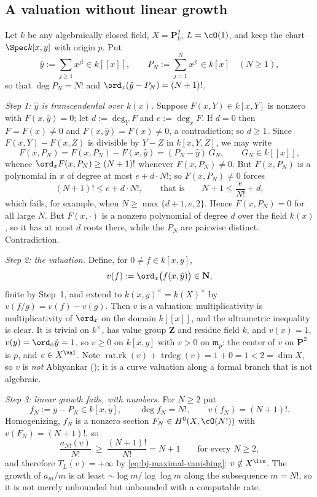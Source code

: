 \subsection{A valuation without linear growth}
\label{sec:ch49-no-growth}

\begin{example}
\label{ex:ch49-no-linear-growth}
Let $k$ be any algebraically closed field, $X=\mathbf P^2_k$,
$L=\cO(1)$, and keep the chart $\Spec k[x,y]$ with origin $p$.  Put
\[
 \hat y:=\sum_{j\ge1}x^{j!}\in k[[x]],
 \qquad
 P_N:=\sum_{j=1}^{N}x^{j!}\in k[x]\quad(N\ge1),
\]
so that $\deg P_N=N!$ and
$\ord_x(\hat y-P_N)=(N+1)!$.

\emph{Step 1: $\hat y$ is transcendental over $k(x)$.}  Suppose
$F(x,Y)\in k[x,Y]$ is nonzero with $F(x,\hat y)=0$; let
$d:=\deg_YF$ and $e:=\deg_xF$.  If $d=0$ then
$F=F(x)\ne0$ and $F(x,\hat y)=F(x)\ne0$, a contradiction; so
$d\ge1$.  Since $F(x,Y)-F(x,Z)$ is divisible by $Y-Z$ in
$k[x,Y,Z]$, we may write
\[
 F(x,P_N)=F(x,P_N)-F(x,\hat y)=(P_N-\hat y)\,G_N,
 \qquad G_N\in k[[x]],
\]
whence $\ord_xF(x,P_N)\ge(N+1)!$ whenever $F(x,P_N)\ne0$.  But
$F(x,P_N)$ is a polynomial in $x$ of degree at most
$e+d\cdot N!$; so $F(x,P_N)\ne0$ forces
\[
 (N+1)!\le e+d\cdot N!,
 \qquad\text{that is}\qquad
 N+1\le\frac{e}{N!}+d ,
\]
which fails, for example, when $N\ge\max\{d+1,e,2\}$.  Hence $F(x,P_N)=0$ for all
large $N$.  But $F(x,\cdot)$ is a nonzero polynomial of degree $d$
over the field $k(x)$, so it has at most $d$ roots there, while the
$P_N$ are pairwise distinct.  Contradiction.

\emph{Step 2: the valuation.}  Define, for $0\ne f\in k[x,y]$,
\[
 v(f):=\ord_x\bigl(f(x,\hat y)\bigr)\in\mathbf N ,
\]
finite by Step~1, and extend to $k(x,y)^\times=k(X)^\times$ by
$v(f/g)=v(f)-v(g)$.  Then $v$ is a valuation: multiplicativity is
multiplicativity of $\ord_x$ on the domain $k[[x]]$, and the
ultrametric inequality is clear.  It is trivial on $k^\times$, has value
group $\mathbf Z$ and residue field $k$, and
$v(x)=1$, $v(y)=\ord_x\hat y=1$, so $v\ge0$ on $k[x,y]$ with
$v>0$ on $\mathfrak m_p$: the center of $v$ on $\mathbf P^2$ is
$p$, and $v\in X^{\val}$.  Note
$\operatorname{rat.rk}(v)+\operatorname{trdeg}(v)=1+0=1<2=\dim X$, so
$v$ is \emph{not} Abhyankar
(); it is a curve valuation along a formal
branch that is not algebraic.

\emph{Step 3: linear growth fails, with numbers.}  For $N\ge2$ put
\[
 f_N:=y-P_N\in k[x,y],
 \qquad \deg f_N=N!,\qquad v(f_N)=(N+1)! .
\]
Homogenizing, $f_N$ is a nonzero section $F_N\in H^0(X,\cO(N!))$ with
$v(F_N)=(N+1)!$, so
\[
 \frac{a_{N!}(v)}{N!}\ \ge\ \frac{(N+1)!}{N!}=N+1
 \qquad\text{for every }N\ge2 ,
\]
and therefore $T_L(v)=+\infty$ by \eqref{eq:bj-maximal-vanishing}:
$v\notin X^{\lin}$.  The growth of $a_m/m$ is at least
$\sim\log m/\log\log m$ along the subsequence $m=N!$, so it is not
merely unbounded but unbounded with a computable rate.


\end{example}
